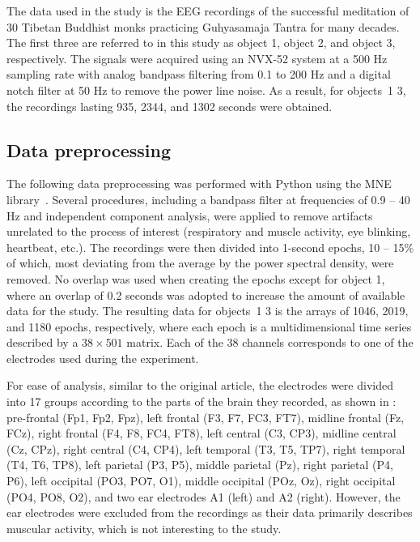 \documentclass[10pt]{iopart}
\begin{document}
The data used in the study is the EEG recordings of the successful meditation of 30 Tibetan Buddhist monks practicing Guhyasamaja Tantra for many decades. The first three are referred to in this study as object 1, object 2, and object 3, respectively. The signals were acquired using an NVX-52 system at a 500 Hz sampling rate with analog bandpass filtering from 0.1 to 200 Hz and a digital notch filter at 50 Hz to remove the power line noise. As a result, for objects~1 3, the recordings lasting 935, 2344, and 1302 seconds were obtained.

\subsection{Data preprocessing}

The following data preprocessing was performed with Python using the MNE library~\cite{MNE}. Several procedures, including a bandpass filter at frequencies of 0.9 -- 40 Hz and independent component analysis, were applied to remove artifacts unrelated to the process of interest (respiratory and muscle activity, eye blinking, heartbeat, etc.). The recordings were then divided into 1-second epochs, 10 -- 15\% of which, most deviating from the average by the power spectral density, were removed. No overlap was used when creating the epochs except for object 1, where an overlap of 0.2 seconds was adopted to increase the amount of available data for the study. The resulting data for objects~1 3 is the arrays of 1046, 2019, and 1180 epochs, respectively, where each epoch is a multidimensional time series described by a $38\times501$ matrix. Each of the 38 channels corresponds to one of the electrodes used during the experiment.

For ease of analysis, similar to the original article, the electrodes were divided into 17 groups according to the parts of the brain they recorded, as shown in : pre-frontal (Fp1, Fp2, Fpz), left frontal (F3, F7, FC3, FT7), midline frontal (Fz, FCz), right frontal (F4, F8, FC4, FT8), left central (C3, CP3), midline central (Cz, CPz), right central (C4, CP4), left temporal (T3, T5, TP7), right temporal (T4, T6, TP8), left parietal (P3, P5), middle parietal (Pz), right parietal (P4, P6), left occipital (PO3, PO7, O1), middle occipital (POz, Oz), right occipital (PO4, PO8, O2), and two ear electrodes A1 (left) and A2 (right). However, the ear electrodes were excluded from the recordings as their data primarily describes muscular activity, which is not interesting to the study.
\end{document}
